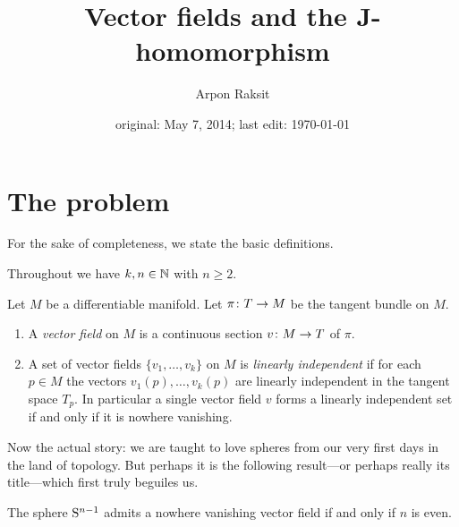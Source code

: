 



\title{Vector fields and the J-homomorphism}
\author{Arpon Raksit}
\date{original: May 7, 2014; last edit: \today}


\maketitle
\thispagestyle{fancy}


\section{The problem}

For the sake of completeness, we state the basic definitions.

\begin{notation}
  Throughout we have $k,n \in \N$ with $n \ge 2$.
\end{notation}

\begin{definitions}
  \label{vfield-dfn}
  Let $M$ be a differentiable manifold. Let $\pi \c T \to M$ be the
  tangent bundle on $M$.
  \begin{enumerate}
  \item A \emph{vector field} on $M$ is a continuous section $v \c M
    \to T$ of $\pi$.
  \item A set of vector fields $\{v_1,\ldots,v_k\}$ on $M$ is
    \emph{linearly independent} if for each $p \in M$ the vectors
    $v_1(p),\ldots,v_k(p)$ are linearly independent in the tangent
    space $T_p$. In particular a single vector field $v$ forms a
    linearly independent set if and only if it is nowhere vanishing.
  \end{enumerate}
\end{definitions}

Now the actual story: we are taught to love spheres from our very
first days in the land of topology. But perhaps it is the following
result---or perhaps really its title---which first truly beguiles us.

\begin{theorem}
  \label{hairy-ball}
  The sphere $\S^{n-1}$ admits a nowhere vanishing vector field if and
  only if $n$ is even.
\end{theorem}

